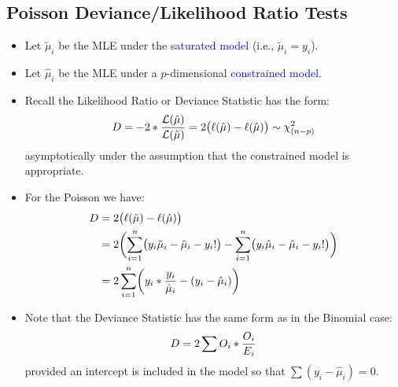 \documentclass[oneside]{book}\usepackage[]{graphicx}\usepackage[svgnames]{xcolor}
\let\log\relax%
\begin{document}
\subsection*{Poisson Deviance/Likelihood Ratio Tests}
\begin{itemize}
      \item Let $ \tilde{\mu}_i $ be the MLE under the \textcolor{Blue}{saturated model} (i.e., $ \tilde{\mu}_i=y_i $).
      \item Let $ \hat{\mu}_i $ be the MLE under a $ p $-dimensional \textcolor{Blue}{constrained model}.
      \item Recall the Likelihood Ratio or Deviance Statistic has the form:
            \[ D=-2\log*{\frac{\mathcal{L}(\hat{\mu})}{\mathcal{L}(\tilde{\mu})}}=2\bigl(\ell(\tilde{\mu})-\ell(\hat{\mu})\bigr)\sim \chi^2_{(n-p)} \]
            asymptotically under the assumption that the constrained model is appropriate.
      \item For the Poisson we have:
            \begin{align*}
                  D
                   & =2\bigl(\ell(\tilde{\mu})-\ell(\hat{\mu})\bigr)                                                                                                                   \\
                   & =2\biggl(\sum_{i=1}^{n} \bigl(y_i\log{\tilde{\mu}_i}-\tilde{\mu}_i-\log{y_i!}\bigr)-\sum_{i=1}^{n} \bigl(y_i\log{\hat{\mu}_i}-\hat{\mu}_i-\log{y_i!}\bigr)\biggr) \\
                   & =2 \sum_{i=1}^{n}\biggl(y_i\log*{\frac{y_i}{\hat{\mu}_i}}-(y_i-\hat{\mu}_i)\biggr)
            \end{align*}
      \item Note that the Deviance Statistic has the same form as in the Binomial case:
            \[ D=2\sum O_i\log*{\frac{O_i}{E_i}} \]
            provided an intercept is included in the model so that $ \sum (y_i-\hat{\mu}_i)=0 $.
\end{itemize}
\end{document}
